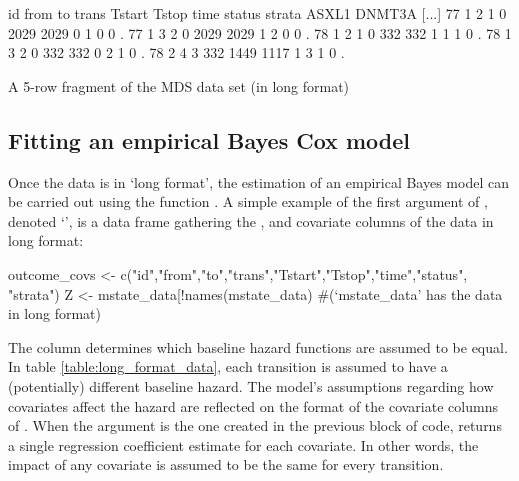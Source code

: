 \begin{table}
\begin{example}
id  from to trans Tstart Tstop time status  strata ASXL1 DNMT3A [...]  
77     1  2     1      0  2029 2029      0       1     0      0    .
77     1  3     2      0  2029 2029      1       2     0      0    .
78     1  2     1      0   332  332      1       1     1      0    .
78     1  3     2      0   332  332      0       2     1      0    .
78     2  4     3    332  1449 1117      1       3     1      0    .
\end{example}
\caption{A 5-row fragment of the MDS data set (in long format)}
\label{table:long_format_data}
\end{table}

\subsection{Fitting an empirical Bayes Cox model}
\label{sec:fit_bayes_cox_model}
Once the data is in `long format', the estimation of an empirical Bayes model can be carried out using the function . A simple example of the first argument of , denoted `', is a data frame gathering the ,  and covariate columns of the data in long format:
\begin{example}
outcome_covs <- c("id","from","to","trans","Tstart","Tstop","time","status",
                  "strata")
Z <- mstate_data[!names(mstate_data) %
#(`mstate_data' has the data in long format) 
\end{example}
The  column  determines which baseline hazard functions are assumed to be equal.
 In table \ref{table:long_format_data}, each transition is assumed to have a (potentially) different baseline hazard. The model's assumptions regarding how covariates affect the hazard are reflected on the format of the covariate columns of . When the  argument is the one created in the previous block of code,  returns a single regression coefficient estimate for each covariate. In other words, the impact of any covariate  is assumed to be the same for every transition. 


